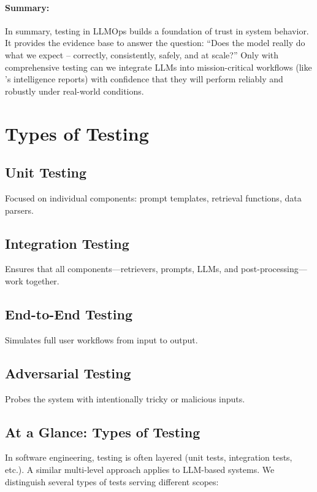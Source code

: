 \paragraph*{Summary:}
In summary, testing in LLMOps builds a foundation of trust in system behavior. It provides the evidence base to answer the question: “Does the model really do what we expect – correctly, consistently, safely, and at scale?” Only with comprehensive testing can we integrate LLMs into mission-critical workflows (like \ishtar{}’s intelligence reports) with confidence that they will perform reliably and robustly under real-world conditions.

\section{Types of Testing}
\label{sec:ch10-types-of-testing}
\subsection{Unit Testing}
Focused on individual components: prompt templates, retrieval functions, data parsers.

\subsection{Integration Testing}
Ensures that all components—retrievers, prompts, LLMs, and post-processing—work together.

\subsection{End-to-End Testing}
Simulates full user workflows from input to output.

\subsection{Adversarial Testing}
Probes the system with intentionally tricky or malicious inputs.

\subsection*{At a Glance: Types of Testing}
In software engineering, testing is often layered (unit tests, integration tests, etc.). A similar multi-level approach applies to LLM-based systems. We distinguish several types of tests serving different scopes:


